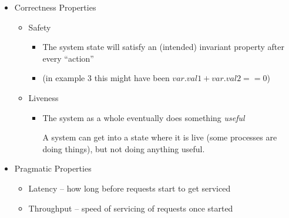 \documentclass{concdistfoils}
\begin{document}
\begin{slide}
\begin{itemize}
\item Correctness Properties
\begin{itemize}
        \item Safety
        \begin{itemize}
          \item The system state will satisfy an (intended) invariant property after every ``action''
          \item (in example 3 this might have been $var.val1+var.val2==0$)
        \end{itemize}
        \item Liveness
        \begin{itemize}
          \item The system as a whole eventually does something \textit{useful}
          \begin{note}
            A system can get into a state where it is live (some processes
            are doing things), but not doing anything useful. 
          \end{note}
        \end{itemize}
\end{itemize}
\vfill
\item Pragmatic Properties
\begin{itemize}
        \item Latency -- how long before requests start to get serviced
        \item Throughput -- speed of servicing of requests once started
\end{itemize}
\end{itemize}
\end{slide}
\end{document}
